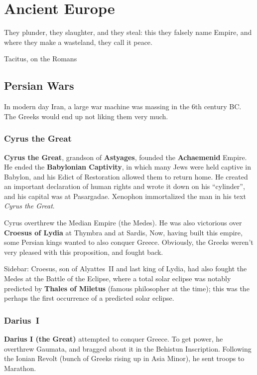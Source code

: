 \chapter{Ancient Europe}

\epigraph{%
  They plunder, they slaughter, and they steal:
  this they falsely name Empire, and where they make a wasteland, they call it peace.
}{Tacitus, on the Romans}

\section{Persian Wars}

In modern day Iran, a large war machine was massing in the 6th century BC\@.
The Greeks would end up not liking them very much.

\subsection*{Cyrus the Great}

\textbf{Cyrus the Great}, grandson of \textbf{Astyages}, founded the \textbf{Achaemenid} Empire.
He ended the \textbf{Babylonian Captivity}, in which many Jews were held captive in Babylon,
and his Edict of Restoration allowed them to return home.
He created an important declaration of human rights and wrote it down on his ``cylinder'',
and his capital was at Pasargadae.
Xenophon immortalized the man in his text \textit{Cyrus the Great}.

Cyrus overthrew the Median Empire (the Medes).
He was also victorious over \textbf{Croesus of Lydia} at Thymbra and at Sardis,
Now, having built this empire, some Persian kings wanted to also conquer Greece.
Obviously, the Greeks weren't very pleased with this proposition, and fought back.

Sidebar:
Croesus, son of Alyattes~II and last king of Lydia,
had also fought the Medes at the Battle of the Eclipse,
where a total solar eclipse was notably predicted by \textbf{Thales of Miletus} (famous philosopher at the time);
this was the perhaps the first occurrence of a predicted solar eclipse.

\subsection*{Darius~I}

\textbf{Darius I (the Great)} attempted to conquer Greece.
To get power, he overthrew Gaumata, and bragged about it in the Behistun Inscription.
Following the Ionian Revolt (bunch of Greeks rising up in Asia Minor), he sent troops to Marathon.

